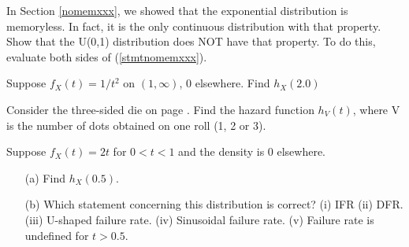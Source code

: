 \oneproblem
In Section \ref{nomemxxx}, we showed that the exponential distribution
is memoryless.  In fact, it is the only continuous distribution with
that property.  Show that the U(0,1) distribution does NOT have that
property.  To do this, evaluate both sides of (\ref{stmtnomemxxx}).

\oneproblem
Suppose $f_X(t) = 1/t^2$ on $(1,\infty)$, 0 elsewhere.  Find
$h_X(2.0)$

\oneproblem
Consider the three-sided die on page \pageref{threesideddiepage}.
Find the hazard function $h_V(t)$, where V is the number of dots
obtained on one roll (1, 2 or 3).

\oneproblem
Suppose $f_X(t) = 2t$ for $0 < t <1$ and the density is 0
elsewhere.

\begin{itemize}

\item [(a)] Find $h_X(0.5)$.

\item [(b)] Which statement concerning this distribution is correct?
(i) IFR  (ii) DFR. (iii) U-shaped failure rate. (iv) Sinusoidal failure
rate. (v) Failure rate is undefined for $t > 0.5$.

\end{itemize}


